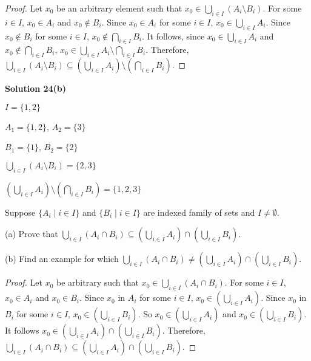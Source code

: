 \begin{proof}
    Let $x_0$ be an arbitrary element such that $x_0 \in \bigcup_{i \in I} (A_i \setminus B_i)$.
    For some $i \in I$, $x_0 \in A_i$ and $x_0 \not \in B_i$.
    Since $x_0 \in A_i$ for some $i \in I$, $x_0 \in \bigcup_{i \in I} A_i$.
    Since $x_0 \not \in B_i$ for some $i \in I$, $x_0 \not \in \bigcap_{i \in I} B_i$.
    It follows, since $x_0 \in \bigcup_{i \in I} A_i$ and $x_0 \not \in \bigcap_{i \in I} B_i$,
    $x_0 \in \bigcup_{i \in I} A_i \setminus \bigcap_{i \in I} B_i$.
    Therefore,  $\bigcup_{i \in I} (A_i \setminus B_i)
        \subseteq (\bigcup_{i \in I} A_i) \setminus (\bigcap_{i \in I} B_i)$.
\end{proof}

\textbf{Solution 24(b)}

$I = \{1, 2\}$

$A_1 = \{1, 2\}$, $A_2 = \{3\}$

$B_1 = \{1\}$, $B_2 = \{2\}$

$\bigcup_{i \in I} (A_i \setminus B_i) = \{2, 3\}$

$(\bigcup_{i \in I} A_i) \setminus (\bigcap_{i \in I} B_i) = \{1, 2, 3\}$

\begin{tcolorbox}[title=Problem 25, breakable]
    Suppose $\{A_i \mid i \in I\}$ and $\{B_i \mid i \in I\}$ are indexed family of sets and 
    $I \not = \emptyset$.

    (a) Prove that $\bigcup_{i \in I}(A_i \cap B_i)
        \subseteq (\bigcup_{i \in I} A_i) \cap (\bigcup_{i \in I} B_i)$.

    (b) Find an example for which $\bigcup_{i \in I} (A_i \cap B_i)
        \not = (\bigcup_{i \in I} A_i) \cap (\bigcup_{i \in I} B_i)$.
\end{tcolorbox}

\begin{proof}
    Let $x_0$ be arbitrary such that $x_0 \in \bigcup_{i \in I} (A_i \cap B_i)$.
    For some $i \in I$, $x_0 \in A_i$ and $x_0 \in B_i$.
    Since $x_0$ in $A_i$ for some $i \in I$, $x_0 \in (\bigcup_{i \in I} A_i)$.
    Since $x_0$ in $B_i$ for some $i \in I$, $x_0 \in (\bigcup_{i \in I} B_i)$.
    So $x_0 \in (\bigcup_{i \in I} A_i)$ and $x_0 \in (\bigcup_{i \in I} B_i)$.
    It follows $x_0 \in (\bigcup_{i \in I} A_i) \cap (\bigcup_{i \in I} B_i)$.
    Therefore, $\bigcup_{i \in I}(A_i \cap B_i)
        \subseteq (\bigcup_{i \in I} A_i) \cap (\bigcup_{i \in I} B_i)$.
\end{proof}


